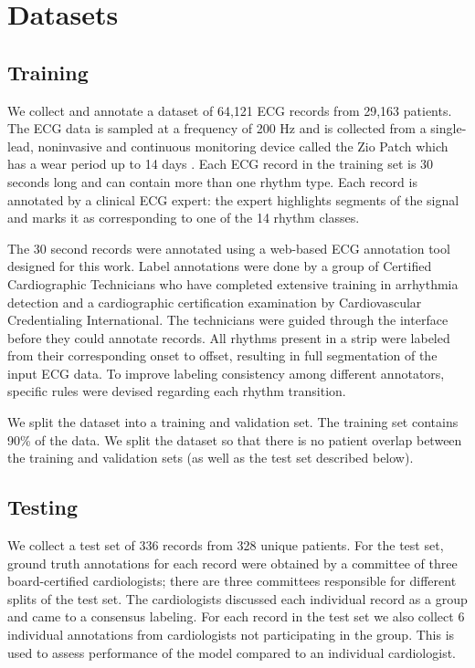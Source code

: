 \section{Datasets}
\label{sec:arrhythmias:data}

\subsection*{Training}
We collect and annotate a dataset of 64,121 ECG records from 29,163 patients.
The ECG data is sampled at a frequency of 200 Hz and is collected from a
single-lead, noninvasive and  continuous monitoring device called the Zio Patch
which has a wear period up to 14 days \cite{turakhia2013diagnostic}. Each ECG
record in the training set is 30 seconds long and can contain more than one
rhythm type. Each record is annotated by a clinical ECG expert: the expert
highlights segments of the signal and marks it as corresponding to one of the
14 rhythm classes.

The 30 second records were annotated using a web-based ECG annotation tool
designed for this work. Label annotations were done by a group of Certified
Cardiographic Technicians who have completed extensive training in arrhythmia
detection and a cardiographic certification examination by Cardiovascular
Credentialing International. The technicians were guided through the interface
before they could annotate records. All rhythms present in a strip were labeled
from their corresponding onset to offset, resulting in full segmentation of the
input ECG data. To improve labeling consistency among different annotators,
specific rules were devised regarding each rhythm transition.

We split the dataset into a training and validation set. The training set
contains 90\% of the data. We split the dataset so that there is no patient
overlap between the training and validation sets (as well as the test set
described below).

\subsection*{Testing}

We collect a test set of 336 records from 328 unique patients. For the test
set, ground truth annotations for each record were obtained by a committee of
three board-certified cardiologists; there are three committees responsible for
different splits of the test set. The cardiologists discussed each individual
record as a group and came to a consensus labeling. For each record in the test
set we also collect 6 individual annotations from cardiologists not
participating in the group. This is used to assess performance of the model
compared to an individual cardiologist.

